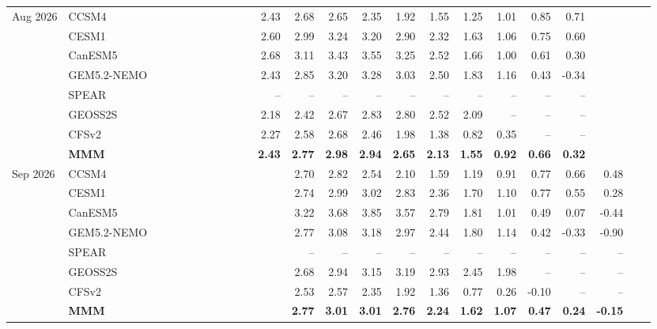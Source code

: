 \documentclass{article}
\begin{document}
\begin{longtable}{llrrrrrrrrrrrrrrrrrrrrrr}
\midrule
Aug 2026 & CCSM4 &  &  &  &  &  &  &  &  &  & 2.43 & 2.68 & 2.65 & 2.35 & 1.92 & 1.55 & 1.25 & 1.01 & 0.85 & 0.71 &  &  &  \\
 & CESM1 &  &  &  &  &  &  &  &  &  & 2.60 & 2.99 & 3.24 & 3.20 & 2.90 & 2.32 & 1.63 & 1.06 & 0.75 & 0.60 &  &  &  \\
 & CanESM5 &  &  &  &  &  &  &  &  &  & 2.68 & 3.11 & 3.43 & 3.55 & 3.25 & 2.52 & 1.66 & 1.00 & 0.61 & 0.30 &  &  &  \\
 & GEM5.2-NEMO &  &  &  &  &  &  &  &  &  & 2.43 & 2.85 & 3.20 & 3.28 & 3.03 & 2.50 & 1.83 & 1.16 & 0.43 & -0.34 &  &  &  \\
 & SPEAR &  &  &  &  &  &  &  &  &  & -- & -- & -- & -- & -- & -- & -- & -- & -- & -- &  &  &  \\
 & GEOSS2S &  &  &  &  &  &  &  &  &  & 2.18 & 2.42 & 2.67 & 2.83 & 2.80 & 2.52 & 2.09 & -- & -- & -- &  &  &  \\
 & CFSv2 &  &  &  &  &  &  &  &  &  & 2.27 & 2.58 & 2.68 & 2.46 & 1.98 & 1.38 & 0.82 & 0.35 & -- & -- &  &  &  \\
 & \textbf{MMM} &  &  &  &  &  &  &  &  &  & \textbf{2.43} & \textbf{2.77} & \textbf{2.98} & \textbf{2.94} & \textbf{2.65} & \textbf{2.13} & \textbf{1.55} & \textbf{0.92} & \textbf{0.66} & \textbf{0.32} &  &  &  \\
\midrule
Sep 2026 & CCSM4 &  &  &  &  &  &  &  &  &  &  & 2.70 & 2.82 & 2.54 & 2.10 & 1.59 & 1.19 & 0.91 & 0.77 & 0.66 & 0.48 &  &  \\
 & CESM1 &  &  &  &  &  &  &  &  &  &  & 2.74 & 2.99 & 3.02 & 2.83 & 2.36 & 1.70 & 1.10 & 0.77 & 0.55 & 0.28 &  &  \\
 & CanESM5 &  &  &  &  &  &  &  &  &  &  & 3.22 & 3.68 & 3.85 & 3.57 & 2.79 & 1.81 & 1.01 & 0.49 & 0.07 & -0.44 &  &  \\
 & GEM5.2-NEMO &  &  &  &  &  &  &  &  &  &  & 2.77 & 3.08 & 3.18 & 2.97 & 2.44 & 1.80 & 1.14 & 0.42 & -0.33 & -0.90 &  &  \\
 & SPEAR &  &  &  &  &  &  &  &  &  &  & -- & -- & -- & -- & -- & -- & -- & -- & -- & -- &  &  \\
 & GEOSS2S &  &  &  &  &  &  &  &  &  &  & 2.68 & 2.94 & 3.15 & 3.19 & 2.93 & 2.45 & 1.98 & -- & -- & -- &  &  \\
 & CFSv2 &  &  &  &  &  &  &  &  &  &  & 2.53 & 2.57 & 2.35 & 1.92 & 1.36 & 0.77 & 0.26 & -0.10 & -- & -- &  &  \\
 & \textbf{MMM} &  &  &  &  &  &  &  &  &  &  & \textbf{2.77} & \textbf{3.01} & \textbf{3.01} & \textbf{2.76} & \textbf{2.24} & \textbf{1.62} & \textbf{1.07} & \textbf{0.47} & \textbf{0.24} & \textbf{-0.15} &  &  \\

\end{longtable}
\end{document}
